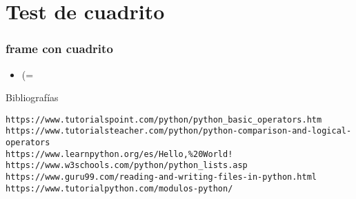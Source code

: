 \documentclass[hyperref={pdfpagelabels=false},xcolor=pst,pdf,fragile]{beamer}
\begin{document}
\section{Test de cuadrito}
\begin{frame}[fragile]
  \frametitle{frame con cuadrito }
  \begin{itemize}
	\item (=
	\pause
  \end{itemize}

    \begin{block}{Bibliografías} %
	  \begin{lstlisting}
https://www.tutorialspoint.com/python/python_basic_operators.htm
https://www.tutorialsteacher.com/python/python-comparison-and-logical-operators
https://www.learnpython.org/es/Hello,%20World!
https://www.w3schools.com/python/python_lists.asp
https://www.guru99.com/reading-and-writing-files-in-python.html
https://www.tutorialpython.com/modulos-python/
	  \end{lstlisting}
  \end{block}
  
\end{frame}
\end{document}

